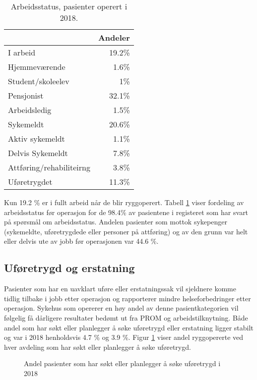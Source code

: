 \documentclass [norsk,a4paper,twoside]{article}\usepackage[]{graphicx}\usepackage[]{color}
\begin{document}
\begin{table}[ht]
\centering
\begin{tabular}{lr}
  \hline
 & Andeler \\ 
  \hline
I arbeid & 19.2\% \\ 
  Hjemmeværende & 1.6\% \\ 
  Student/skoleelev & 1\% \\ 
  Pensjonist & 32.1\% \\ 
  Arbeidsledig & 1.5\% \\ 
  Sykemeldt & 20.6\% \\ 
  Aktiv sykemeldt & 1.1\% \\ 
  Delvis Sykemeldt & 7.8\% \\ 
  Attføring/rehabiliteirng & 3.8\% \\ 
  Uføretrygdet & 11.3\% \\ 
   \hline
\end{tabular}
\caption{Arbeidsstatus, pasienter operert i 2018.} 
\label{tab:Arb}
\end{table}


Kun 19.2 \% er i fullt arbeid når de blir ryggoperert.
Tabell \ref{tab:Arb} viser fordeling av arbeidsstatus før operasjon for de 98.4\% 
av pasientene i registeret som har svart på spørsmål om arbeidsstatus. 
Andelen pasienter som mottok sykepenger (sykemeldte, uføretrygdede eller personer 
på attføring) og av den grunn var helt eller delvis ute av jobb før operasjonen var 
44.6 \%. 



\subsection{Uføretrygd og erstatning }




Pasienter som har en uavklart uføre eller erstatningssak vil sjeldnere komme tidlig tilbake i jobb etter operasjon og rapporterer mindre helseforbedringer etter operasjon. Sykehus som opererer en høy andel av denne pasientkategorien vil følgelig få dårligere resultater bedømt ut fra PROM og arbeidstilknytning.
Både andel som har søkt eller planlegger å søke uføretrygd eller erstatning ligger stabilt og var i 2018 
henholdsvis 4.7 \% og 3.9 \%. 
Figur \ref{fig:Ufor} viser andel ryggopererte ved hver avdeling som har søkt eller planlegger å søke uføretrygd.

\begin{figure}[ht]
\caption{\label{fig:Ufor} Andel pasienter som har søkt eller planlegger å søke uføretrygd i 2018} 
\end{figure}
\end{document}
